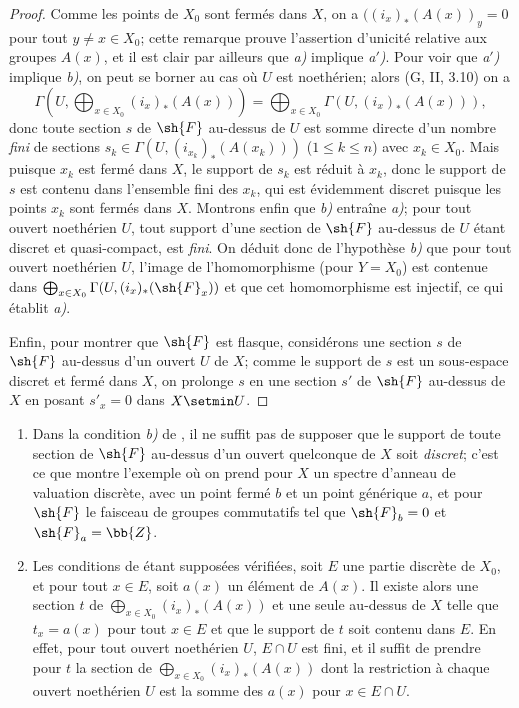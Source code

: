 \begin{proof}
Comme les points de $X_0$ sont fermés dans $X$, on a $((i_x)_*(A(x))_y=0$ pour tout
$y\neq x\in X_0$;
cette remarque prouve l'assertion d'unicité relative aux groupes $A(x)$, et il est clair par ailleurs que \emph{a)} implique \emph{a$'$)}.
Pour voir que \emph{a$'$)} implique \emph{b)}, on peut se borner au cas où $U$ est noethérien;
alors (G, II, 3.10) on a
\[
  \Gamma(U,\bigoplus_{x\in X_0}(i_x)_*(A(x)))
  =\bigoplus_{x\in X_0}\Gamma(U,(i_x)_*(A(x))),
\]
donc toute section $s$ de $\sh{F}$ au-dessus de $U$ est somme directe d'un nombre \emph{fini} de sections $s_k\in\Gamma(U,(i_{x_k})_*(A(x_k)))$ ($1\leq k\leq n$) avec $x_k\in X_0$.
Mais puisque $x_k$ est fermé dans $X$, le support de $s_k$ est réduit à $x_k$, donc le support de $s$ est contenu dans l'ensemble fini des $x_k$, qui est évidemment discret puisque les points $x_k$ sont fermés dans $X$.
Montrons enfin que \emph{b)} entraîne \emph{a)};
pour tout ouvert noethérien $U$, tout support d'une section de $\sh{F}$ au-dessus de $U$ étant discret et quasi-compact, est \emph{fini}.
On déduit donc de l'hypothèse \emph{b)} que pour tout ouvert noethérien $U$, l'image de l'homomorphisme  (pour $Y=X_0$) est contenue dans $\bigoplus_{x\in X_0}\Gamma(U,(i_x)_*(\sh{F}_x))$ et que cet homomorphisme est injectif, ce qui établit \emph{a)}.

Enfin, pour montrer que $\sh{F}$ est flasque, considérons une section $s$ de $\sh{F}$ au-dessus d'un ouvert $U$ de $X$;
comme le support de $s$ est un sous-espace discret et fermé dans $X$, on prolonge $s$ en une section $s'$ de $\sh{F}$ au-dessus de $X$ en posant $s'_x=0$ dans $X\setmin U$.
\end{proof}

\begin{remarks}[21.9.3]
\label{IV.21.9.3}
\begin{enumerate}[label=(\roman*)]
  \item Dans la condition \emph{b)} de , il ne suffit pas de supposer que le support de toute section de $\sh{F}$ au-dessus d'un ouvert quelconque de $X$ soit \emph{discret};
c'est ce que montre l'exemple où on prend pour $X$ un spectre d'anneau de valuation discrète, avec un point fermé $b$ et un point générique $a$, et pour $\sh{F}$ le faisceau de groupes commutatifs tel que $\sh{F}_b=0$ et $\sh{F}_a=\bb{Z}$.

  \item Les conditions de  étant supposées vérifiées, soit $E$ une partie discrète de $X_0$, et pour tout $x\in E$, soit $a(x)$ un élément de $A(x)$.
Il existe alors une section $t$ de $\bigoplus_{x\in X_0}(i_x)_*(A(x))$ et une seule au-dessus de $X$ telle que $t_x=a(x)$ pour tout $x\in E$ et que le support de $t$ soit contenu dans $E$.
En effet, pour tout ouvert noethérien $U$, $E\cap U$ est fini, et il suffit de prendre pour $t$ la section de $\bigoplus_{x\in X_0}(i_x)_*(A(x))$ dont la restriction à chaque ouvert noethérien $U$ est la somme des $a(x)$ pour $x\in E\cap U$.
\end{enumerate}
\end{remarks}

